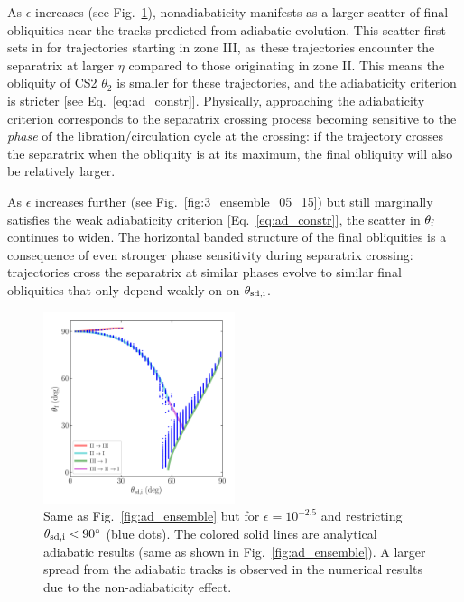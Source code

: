 \documentclass[
        fleqn,
        usenatbib,
    ]{mnras}
\begin{document}
As $\epsilon$ increases (see Fig.~\ref{fig:3_ensemble_05_25}), nonadiabaticity
manifests as a larger scatter of final obliquities near the tracks predicted
from adiabatic evolution. This scatter first sets in for trajectories starting
in zone III, as these trajectories encounter the separatrix at larger $\eta$
compared to those originating in zone II\@. This means the obliquity of CS2
$\theta_2$ is smaller for these trajectories, and the adiabaticity criterion is
stricter [see Eq.~\eqref{eq:ad_constr}]. Physically, approaching the
adiabaticity criterion corresponds to the separatrix crossing process becoming
sensitive to the \emph{phase} of the libration/circulation cycle at the
crossing: if the trajectory crosses the separatrix when the obliquity is at its
maximum, the final obliquity will also be relatively larger.

As $\epsilon$ increases further (see Fig.~\ref{fig:3_ensemble_05_15}) but still
marginally satisfies the weak adiabaticity criterion [Eq.~\eqref{eq:ad_constr}],
the scatter in $\theta_{\rm f}$ continues to widen. The horizontal banded
structure of the final obliquities is a consequence of even stronger phase
sensitivity during separatrix crossing: trajectories cross the separatrix at
similar phases evolve to similar final obliquities that only depend weakly on
on $\theta_{\rm sd, i}$.

\begin{figure}
    \centering
    \includegraphics[width=0.5\textwidth]{plots_diskdisp/3_ensemble_05_25.png}
    \caption{Same as Fig.~\ref{fig:ad_ensemble} but for $\epsilon = 10^{-2.5}$
    and restricting $\theta_{\rm sd, i} < 90^\circ$ (blue dots). The colored
    solid lines are analytical adiabatic results (same as shown in
    Fig.~\ref{fig:ad_ensemble}). A larger spread from the adiabatic tracks is
    observed in the numerical results due to the non-adiabaticity effect.
    }\label{fig:3_ensemble_05_25}
\end{figure}
\end{document}

